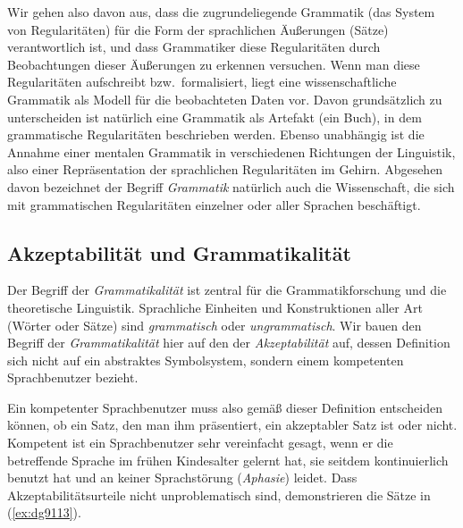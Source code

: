 
Wir gehen also davon aus, dass die zugrundeliegende Grammatik (das System von Regularitäten) für die Form der sprachlichen Äußerungen (\zB Sätze) verantwortlich ist, und dass Grammatiker diese Regularitäten durch Beobachtungen dieser Äußerungen zu erkennen versuchen.
Wenn man diese Regularitäten aufschreibt bzw.\ formalisiert, liegt eine wissenschaftliche Grammatik als Modell für die beobachteten Daten vor.
Davon grundsätzlich zu unterscheiden ist natürlich eine Grammatik als Artefakt (\zB ein Buch), in dem grammatische Regularitäten beschrieben werden.
Ebenso unabhängig ist die Annahme einer mentalen Grammatik in verschiedenen Richtungen der Linguistik, also einer Repräsentation der sprachlichen Regularitäten im Gehirn.
Abgesehen davon bezeichnet der Begriff \textit{Grammatik} natürlich auch die Wissenschaft, die sich mit grammatischen Regularitäten einzelner oder aller Sprachen beschäftigt.

\subsection{Akzeptabilität und Grammatikalität}

\label{sec:akzeptabilitaetgrammatikalitaet}


Der Begriff der \textit{Grammatikalität} ist zentral für die Grammatikforschung und die theoretische Linguistik.
Sprachliche Einheiten und Konstruktionen aller Art (\zB Wörter oder Sätze) sind \textit{grammatisch} oder \textit{ungrammatisch}.
Wir bauen den Begriff der \textit{Grammatikalität} hier auf den der \textit{Akzeptabilität} auf, dessen Definition sich nicht auf ein abstraktes Symbolsystem, sondern einem kompetenten Sprachbenutzer bezieht.


Ein kompetenter Sprachbenutzer muss also gemäß dieser Definition entscheiden können, ob ein Satz, den man ihm präsentiert, ein akzeptabler Satz ist oder nicht.
Kompetent ist ein Sprachbenutzer sehr vereinfacht gesagt, wenn er die betreffende Sprache im frühen Kindesalter gelernt hat, sie seitdem kontinuierlich benutzt hat und an keiner Sprachstörung (\textit{Aphasie}) leidet.
Dass Akzeptabilitätsurteile nicht unproblematisch sind, demonstrieren die Sätze in (\ref{ex:dg9113}).


